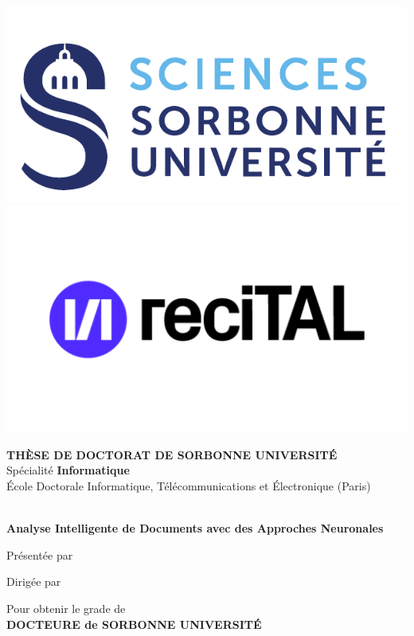 \begin{titlepage}

\vspace*{-2.5cm}
\includegraphics[height=0.15\columnwidth]{images/sorbonne}
\vspace*{0.5cm}
\hspace*{5.5cm}
\includegraphics[height=0.15\columnwidth]{images/recital-logo-new.pdf}
\vspace*{-0.25cm}

\begin{center}

{\large \textbf{T\normalsize{HÈSE DE}\large{} D\normalsize{OCTORAT DE}\large{} S\normalsize{ORBONNE}\large{} U\normalsize{NIVERSITÉ}}}\\
Spécialité \textbf{Informatique}\\ 
École Doctorale Informatique, Télécommunications et Électronique (Paris)

\vspace*{1.5cm}

{\Large \textbf{\myTitleFront}} \\[0.5em]
{\large \textbf{Analyse Intelligente de Documents avec des Approches Neuronales}}

\vspace*{1.2cm}

Présentée par\\
{\large \textbf{\myName}}

\vspace*{2mm}

Dirigée par\\
\textbf{\myProf}

\vspace*{5mm}

Pour obtenir le grade de \ \\
\textbf{DOCTEURE de SORBONNE UNIVERSITÉ} \ \\


\end{center}
\end{titlepage}
